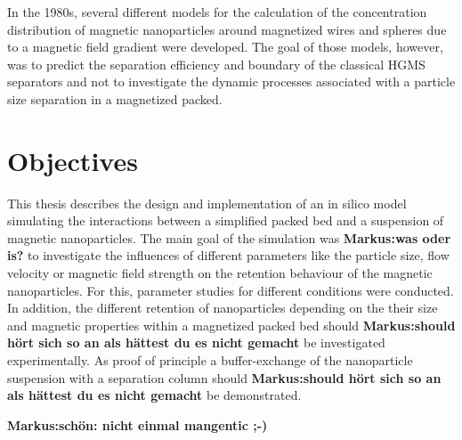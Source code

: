 In the 1980s, several different models for the calculation of the concentration distribution of magnetic nanoparticles around magnetized wires \cite{gerber1984magnetic,davies19902,fletcher1991fine} and spheres \cite{moyer1986filtration} due to a magnetic field gradient were developed. The goal of those models, however, was to predict the separation efficiency and boundary of the classical HGMS separators and not to investigate the dynamic processes associated with a particle size separation in a magnetized packed.

\section{Objectives}
\label{sec:Objectives}

This thesis describes the design and implementation of an in silico model simulating the interactions between a simplified packed bed and a suspension of magnetic nanoparticles. The main goal of the simulation was \textbf{Markus:was oder is?} to investigate the influences of different parameters like the particle size, flow velocity or magnetic field strength on the retention behaviour of the magnetic nanoparticles. For this, parameter studies for different conditions were conducted. In addition, the different retention of nanoparticles depending on the their size and magnetic properties within a magnetized packed bed should \textbf{Markus:should hört sich so an als hättest du es nicht gemacht} be investigated experimentally. As proof of principle a buffer-exchange of the nanoparticle suspension with a separation column should \textbf{Markus:should hört sich so an als hättest du es nicht gemacht} be demonstrated. 

\textbf{Markus:schön: nicht einmal mangentic ;-)}